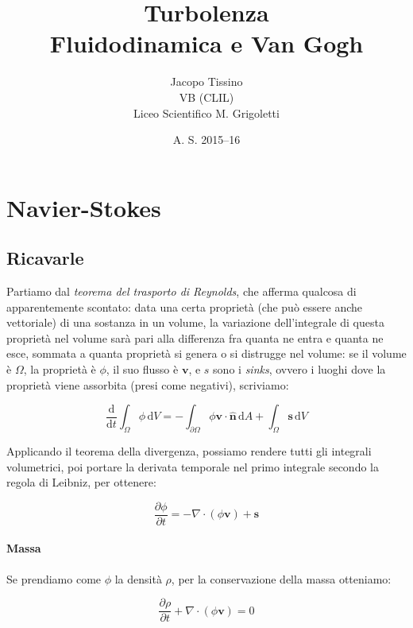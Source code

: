 \documentclass[12pt,a4paper]{article}
\author{Jacopo Tissino \\
VB
(CLIL)\\
Liceo Scientifico M. Grigoletti}
\date{A. S. 2015--16}
\title{\huge{\textbf{Turbolenza}}\\
\Large{Fluidodinamica e Van Gogh}}
\numberwithin{equation}{subsection}
\begin{document}
\maketitle

\section{Navier-Stokes}

\subsection{Ricavarle}

Partiamo \cite{derivationns} dal \emph{teorema del trasporto di Reynolds}, che afferma qualcosa di apparentemente scontato: data una certa proprietà (che può essere anche vettoriale) di una sostanza in un volume, la variazione dell'integrale di questa proprietà nel volume sarà pari alla differenza fra quanta ne entra e quanta ne esce, sommata a quanta proprietà si genera o si distrugge nel volume: se il volume è $\Omega$, la proprietà è $\phi$, il suo flusso è $\mathbf{v}$, e $s$ sono i \emph{sinks}, ovvero i luoghi dove la proprietà viene assorbita (presi come negativi), scriviamo:

\begin{equation}
\frac{\text{d}}{\text{d} t} \int_{\Omega} \phi \, \text{d} V = -
\int_{\partial \Omega} \phi \mathbf{v} \cdot \mathbf{\hat{n}} \, \text{d} A +
\int_{\Omega} \mathbf{s} \, \text{d} V
\end{equation}

Applicando il teorema della divergenza, possiamo rendere tutti gli integrali volumetrici, poi portare la derivata temporale nel primo integrale secondo la regola di Leibniz, per ottenere:

\begin{equation}
\frac{\partial \phi}{\partial t} = - \nabla \cdot ( \phi \mathbf{v} ) + \mathbf{s}
\end{equation}

\paragraph{Massa}

Se prendiamo come $\phi$ la densità $\rho$, per la conservazione della massa otteniamo:

\begin{equation}
\frac{\partial \rho}{\partial t} + \nabla \cdot ( \phi \mathbf{v} ) = 0 \label{consmassa}
\end{equation}
\end{document}
